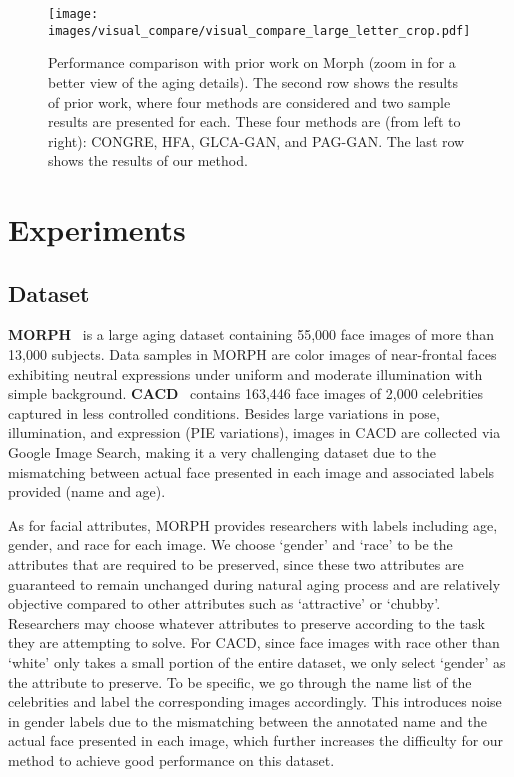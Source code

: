 \documentclass[letterpaper]{article} %
\begin{document}
\begin{figure*}[ht]
\centering\texttt{[image: images/visual\_compare/visual\_compare\_large\_letter\_crop.pdf]}
\caption{Performance comparison with prior work on Morph (zoom in for a better view of the aging details). The second row shows the results of prior work, where four methods are considered and two sample results are presented for each. These four methods are (from left to right): CONGRE, HFA, GLCA-GAN, and PAG-GAN. The last row shows the results of our method.}
\label{fig:compareResults}
\end{figure*}

\section{Experiments}

\subsection{Dataset}
\textbf{MORPH}~\cite{ricanek2006morph} is a large aging dataset containing 55,000 face images of more than 13,000 subjects. 
Data samples in MORPH are color images of near-frontal faces exhibiting neutral expressions under uniform and moderate illumination with simple background. 
\textbf{CACD}~\cite{chen2015face} contains 163,446 face images of 2,000 celebrities captured in less controlled conditions. Besides large variations in pose, illumination, and expression (PIE variations), images in CACD are collected via Google Image Search, making it a very challenging dataset due to the mismatching between actual face presented in each image and associated labels provided (name and age).

As for facial attributes, MORPH provides researchers with labels including age, gender, and race for each image. We choose `gender' and `race' to be the attributes that are required to be preserved, since these two attributes are guaranteed to remain unchanged during natural aging process and are relatively objective compared to other attributes such as `attractive' or `chubby'. 
Researchers may choose whatever attributes to preserve according to the task they are attempting to solve.
For CACD, since face images with race other than `white' only takes a small portion of the entire dataset, we only select `gender' as the attribute to preserve. 
To be specific, we go through the name list of the celebrities and label the corresponding images accordingly. This introduces noise in gender labels due to the mismatching between the annotated name and the actual face presented in each image, which further increases the difficulty for our method to achieve good performance on this dataset.
\end{document}

